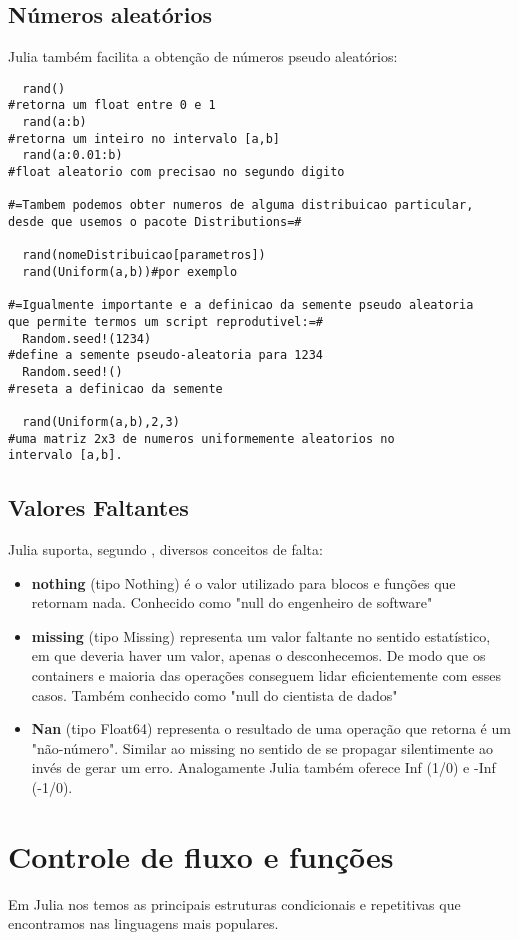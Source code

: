 \subsection{Números aleatórios}
Julia também facilita a obtenção de números pseudo aleatórios:
    \begin{lstlisting}
  rand()  
#retorna um float entre 0 e 1
  rand(a:b) 
#retorna um inteiro no intervalo [a,b]
  rand(a:0.01:b) 
#float aleatorio com precisao no segundo digito

#=Tambem podemos obter numeros de alguma distribuicao particular, 
desde que usemos o pacote Distributions=#

  rand(nomeDistribuicao[parametros])
  rand(Uniform(a,b))#por exemplo

#=Igualmente importante e a definicao da semente pseudo aleatoria
que permite termos um script reprodutivel:=#
  Random.seed!(1234) 
#define a semente pseudo-aleatoria para 1234
  Random.seed!() 
#reseta a definicao da semente

  rand(Uniform(a,b),2,3) 
#uma matriz 2x3 de numeros uniformemente aleatorios no 
intervalo [a,b].

    \end{lstlisting}
\subsection{Valores Faltantes}
Julia suporta, segundo \cite{Lobianco2019}, diversos conceitos de falta:
\begin{itemize}
    \item \textbf{nothing} (tipo Nothing) é o valor utilizado para blocos e funções que retornam nada. Conhecido como "null do engenheiro de software"
    \item \textbf{missing} (tipo Missing) representa um valor faltante no sentido estatístico, em que deveria haver um valor, apenas o desconhecemos. De modo que os containers e maioria das operações conseguem lidar eficientemente com esses casos. Também conhecido como "null do cientista de dados"
    \item \textbf{Nan} (tipo Float64) representa o resultado de uma operação que retorna é um "não-número". Similar ao missing no sentido de se propagar silentimente ao invés de gerar um erro. Analogamente Julia também oferece Inf (1/0) e -Inf (-1/0).
\end{itemize}
\section{Controle de fluxo e funções}
Em Julia nos temos as principais estruturas condicionais e repetitivas que encontramos nas linguagens mais populares.
